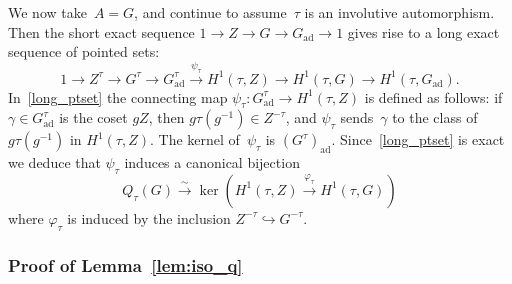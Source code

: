 \documentclass[10pt,leqno]{article}
\numberwithin{equation}{section}
\newcommand{\ad}{\mathrm{ad}}
\newcommand{\Gad}{G_\mathrm{ad}}
\begin{document}
We now take~$A=G$, and continue to assume~$\tau$ is an involutive automorphism. Then the short exact sequence $1\rightarrow Z \rightarrow G \rightarrow \Gad\rightarrow 1$ 
gives rise to a long exact sequence of pointed sets:
\begin{equation} \label{long_ptset}
1\rightarrow Z^\tau \rightarrow G^\tau \rightarrow \Gad^{\tau} \overset{\psi_\tau}{\longrightarrow} H^1(\tau,Z)\to H^1(\tau,G)\rightarrow H^1(\tau,\Gad).
\end{equation}
In~\eqref{long_ptset} the connecting map  $ \psi_\tau\colon \Gad^{\tau} \rightarrow H^1(\tau,Z)$ is defined as follows: if $\gamma \in \Gad^{\tau}$ is the coset $gZ$, then $g\tau(g^{-1}) \in Z^{-\tau}$, and $\psi_\tau$ sends~$\gamma$ to the class of $g \tau(g^{-1})$ in $H^1(\tau, Z)$. The kernel of~$\psi_\tau$ is $(G^\tau)_{\ad}$. Since~\eqref{long_ptset} is exact we deduce that $\psi_\tau$ induces a canonical  bijection
\begin{equation} \label{interp_q_cohomology} Q_{\tau}(G) \overset{\sim}{\longrightarrow}  \ker\left(H^1(\tau,Z)\overset{\varphi_\tau}{\longrightarrow} H^1(\tau,G)\right)\end{equation}
where $\varphi_\tau$ is induced by the inclusion $Z^{-\tau} \hookrightarrow G^{-\tau}$. 


 

\subsubsection{Proof of Lemma~\ref{lem:iso_q}}
\end{document}
